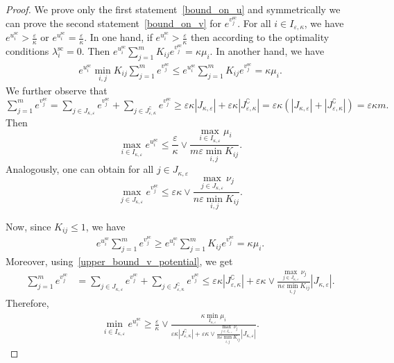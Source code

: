 \documentclass{article}
\begin{document}
\begin{proof}
We prove only the first statement~\eqref{bound_on_u} and symmetrically we can prove the second statement~\eqref{bound_on_v} for $e^{v^{\text{sc}}_j}$.
For all $i\in I_{\varepsilon,\kappa}$, we have $e^{u^{\text{sc}}_i} > \frac \varepsilon\kappa$ or $e^{u^{\text{sc}}_i} = \frac \varepsilon\kappa$. In one hand, if $e^{u^{\text{sc}}_i} > \frac \varepsilon\kappa$ then according to the optimality conditions $\lambda^{\text{sc}}_i = 0.$ Then $e^{u^{\text{sc}}_i} \sum_{j=1}^m K_{ij} e^{v^{\text{sc}}_j} = \kappa\mu_i$.
In another hand, we have 
\begin{align*}
e^{u^{\text{sc}}_i} \min_{i,j}K_{ij} \sum_{j=1}^m e^{v^{\text{sc}}_j} \leq e^{u^{\text{sc}}_i} \sum_{j=1}^m K_{ij} e^{v^{\text{sc}}_j} = \kappa\mu_i.
\end{align*}
We further observe that $\sum_{j=1}^m e^{v^{\text{sc}}_j} = \sum_{j \in J_{\kappa,\varepsilon}} e^{v^{\text{sc}}_j} + \sum_{j \in J^\complement_{\varepsilon,\kappa}} e^{v^{\text{sc}}_j} \geq \varepsilon\kappa |J_{\kappa,\varepsilon}| + \varepsilon\kappa |J^\complement_{\varepsilon,\kappa}| = \varepsilon\kappa (|J_{\kappa,\varepsilon}| + |J^\complement_{\varepsilon,\kappa}|) = \varepsilon\kappa m.$ Then
\begin{equation*}
\max_{i\in I_{\kappa,\varepsilon}} e^{u^{\text{sc}}_i} \leq \frac \varepsilon\kappa \vee \frac{\max_{i\in I_{\kappa,\varepsilon}}\mu_i}{m\varepsilon \min_{i,j}K_{ij}}.
\end{equation*}
Analogously, one can obtain for all $j\in J_{\kappa,\varepsilon}$
\begin{equation}
\label{upper_bound_v_potential}
\max_{j\in J_{\kappa,\varepsilon}}e^{v^{\text{sc}}_j} \leq \varepsilon\kappa \vee \frac{\max_{j \in J_{\kappa,\varepsilon}} \nu_j}{n\varepsilon\min_{i,j}K_{ij}}.
\end{equation}

Now, since $K_{ij} \leq 1$, we have 
\begin{align*}
e^{u^{\text{sc}}_i} \sum_{j=1}^m e^{v^{\text{sc}}_j} \geq e^{u^{\text{sc}}_i} \sum_{j=1}^m K_{ij}e^{v^{\text{sc}}_j} = \kappa\mu_i.
\end{align*}
Moreover, using~\eqref{upper_bound_v_potential}, we get 
\begin{align*}
\sum_{j=1}^m e^{v^{\text{sc}}_j} &= \sum_{j \in J_{\kappa,\varepsilon}} e^{v^{\text{sc}}_j} + \sum_{j \in J^\complement_{\varepsilon,\kappa}} e^{v^{\text{sc}}_j}
\leq \varepsilon\kappa |J^\complement_{\varepsilon,\kappa}| + \varepsilon\kappa \vee \frac{\max_{j\in J_{\kappa,\varepsilon}} \nu_j}{n\varepsilon\min_{i,j}K_{ij}} |J_{\kappa,\varepsilon}|.
\end{align*}
Therefore,
\begin{align*}
\min_{i \in I_{\kappa,\varepsilon}} e^{u^{\text{sc}}_i}  \geq \frac \varepsilon\kappa \vee \frac{\kappa\min_{I_{\kappa,\varepsilon}}\mu_i}{\varepsilon\kappa |J^\complement_{\varepsilon,\kappa}| + \varepsilon\kappa \vee \frac{\max_{j\in J_{\kappa,\varepsilon}} \nu_j}{n\varepsilon\min_{i,j}K_{ij}} |J_{\kappa,\varepsilon}|}.
\end{align*}
\end{proof}
\end{document}
